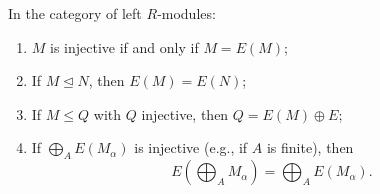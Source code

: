 In the category of left $R$-modules:
\begin{enumerate}
\item[(1)] $M$ is injective if and only if $M = E(M)$;
\item[(2)] If $M \trianglelefteq N$, then $E(M) = E(N)$;
\item[(3)] If $M \leq Q$ with $Q$ injective, then $Q = E(M) \oplus E$;
\item[(4)] If $\bigoplus_A E(M_\alpha)$ is injective (e.g., if $A$ is finite), then
$$E\left(\bigoplus_A M_\alpha\right) = \bigoplus_A E(M_\alpha).$$
\end{enumerate}

